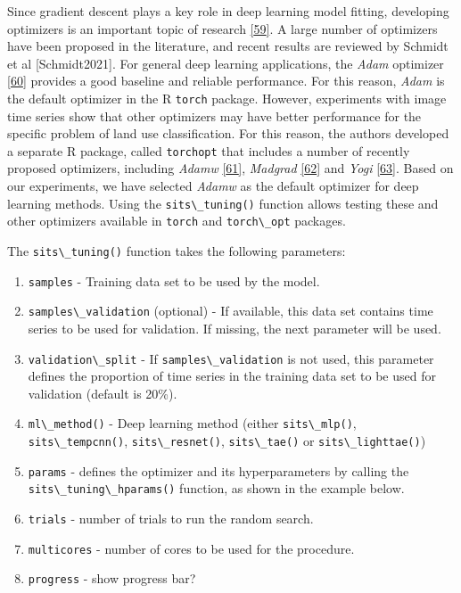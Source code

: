 \documentclass[
  11pt,
]{report}
\newcommand{\passthrough}[1]{#1}
\providecommand{\tightlist}{%
  \setlength{\itemsep}{0pt}\setlength{\parskip}{0pt}}
\begin{document}
Since gradient descent plays a key role in deep learning model fitting,
developing optimizers is an important topic of research
\protect\hyperlink{ref-Bottou2018}{{[}59{]}}. A large number of
optimizers have been proposed in the literature, and recent results are
reviewed by Schmidt et al {[}Schmidt2021{]}. For general deep learning
applications, the \emph{Adam} optimizer
\protect\hyperlink{ref-Kingma2017}{{[}60{]}} provides a good baseline
and reliable performance. For this reason, \emph{Adam} is the default
optimizer in the R \passthrough{\lstinline!torch!} package. However,
experiments with image time series show that other optimizers may have
better performance for the specific problem of land use classification.
For this reason, the authors developed a separate R package, called
\passthrough{\lstinline!torchopt!} that includes a number of recently
proposed optimizers, including \emph{Adamw}
\protect\hyperlink{ref-Loshchilov2019}{{[}61{]}}, \emph{Madgrad}
\protect\hyperlink{ref-Defazio2021}{{[}62{]}} and \emph{Yogi}
\protect\hyperlink{ref-Zaheer2018}{{[}63{]}}. Based on our experiments,
we have selected \emph{Adamw} as the default optimizer for deep learning
methods. Using the \passthrough{\lstinline!sits\_tuning()!} function
allows testing these and other optimizers available in
\passthrough{\lstinline!torch!} and \passthrough{\lstinline!torch\_opt!}
packages.

The \passthrough{\lstinline!sits\_tuning()!} function takes the
following parameters:

\begin{enumerate}
\def\labelenumi{\arabic{enumi}.}
\tightlist
\item
  \passthrough{\lstinline!samples!} - Training data set to be used by
  the model.
\item
  \passthrough{\lstinline!samples\_validation!} (optional) - If
  available, this data set contains time series to be used for
  validation. If missing, the next parameter will be used.
\item
  \passthrough{\lstinline!validation\_split!} - If
  \passthrough{\lstinline!samples\_validation!} is not used, this
  parameter defines the proportion of time series in the training data
  set to be used for validation (default is 20\%).
\item
  \passthrough{\lstinline!ml\_method()!} - Deep learning method (either
  \passthrough{\lstinline!sits\_mlp()!},
  \passthrough{\lstinline!sits\_tempcnn()!},
  \passthrough{\lstinline!sits\_resnet()!},
  \passthrough{\lstinline!sits\_tae()!} or
  \passthrough{\lstinline!sits\_lighttae()!})
\item
  \passthrough{\lstinline!params!} - defines the optimizer and its
  hyperparameters by calling the
  \passthrough{\lstinline!sits\_tuning\_hparams()!} function, as shown
  in the example below.
\item
  \passthrough{\lstinline!trials!} - number of trials to run the random
  search.
\item
  \passthrough{\lstinline!multicores!} - number of cores to be used for
  the procedure.
\item
  \passthrough{\lstinline!progress!} - show progress bar?
\end{enumerate}
\end{document}
